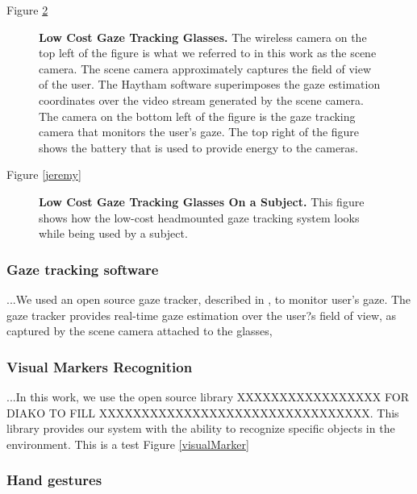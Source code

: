 \documentclass[jou,a4paper,notxfonts]{apa}
\begin{document}
Figure \ref{gazeTrackingGlasses}

\begin{figure}[tp]
 \caption{\textbf{Low Cost Gaze Tracking Glasses.} The wireless camera on the top left of the figure is what we
 referred to in this work as the scene camera. The scene camera approximately captures the field of view of the user.
 The Haytham software superimposes the gaze estimation coordinates over the  video stream generated by the scene
 camera. The camera on the bottom left of the figure is the gaze tracking camera that monitors the user's gaze. The
 top right of the figure shows the battery that is used to provide energy to the cameras.}
 \label{gazeTrackingGlasses}
\end{figure}


Figure \ref{jeremy}

\begin{figure}[tp]
 \caption{\textbf{Low Cost Gaze Tracking Glasses On a Subject.} This figure shows how the low-cost headmounted gaze
 tracking system looks while being used by a subject.}
 \label{gazeTrackingGlasses}
\end{figure}

\subsubsection{Gaze tracking software}
...We used an open source gaze tracker, described in \cite{Mardanbegi2011}, to monitor user's gaze. The gaze tracker provides real-time gaze estimation over the user?s field of view, as captured by the scene camera attached to the glasses,


\subsubsection{Visual Markers Recognition}
 ...In this work, we use the open source library XXXXXXXXXXXXXXXXX FOR DIAKO TO FILL XXXXXXXXXXXXXXXXXXXXXXXXXXXXXXXX. This library provides our system with the ability to recognize specific objects in the environment.
This is a test Figure \ref{visualMarker}

\subsubsection{Hand gestures}
\end{document}
